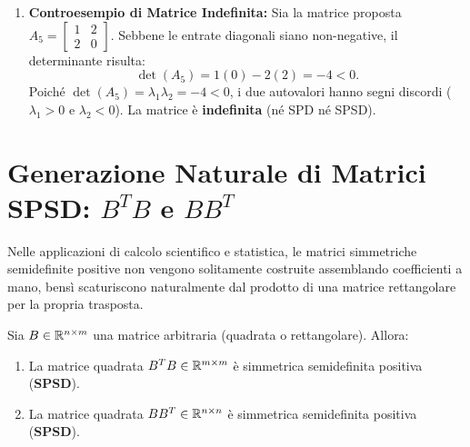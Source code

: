 \begin{example}
\begin{enumerate}
\begin{itemize}
    \end{itemize}
    \item \textbf{Controesempio di Matrice Indefinita:}
    Sia la matrice proposta $A_5 = \begin{bmatrix} 1 & 2 \\ 2 & 0 \end{bmatrix}$. Sebbene le entrate diagonali siano non-negative, il determinante risulta:
    \begin{equation}
        \det(A_5) = 1(0) - 2(2) = -4 < 0.
    \end{equation}
    Poich\'e $\det(A_5) = \lambda_1 \lambda_2 = -4 < 0$, i due autovalori hanno segni discordi ($\lambda_1 > 0$ e $\lambda_2 < 0$). La matrice \`e \textbf{indefinita} (n\'e SPD n\'e SPSD).
\end{enumerate}
\end{example}

\FloatBarrier
\section[Generazione Naturale di Matrici SPSD]{Generazione Naturale di Matrici SPSD: \texorpdfstring{$B^T B$}{B\textasciicircum T B} e \texorpdfstring{$B B^T$}{B B\textasciicircum T}}

Nelle applicazioni di calcolo scientifico e statistica, le matrici simmetriche semidefinite positive non vengono solitamente costruite assemblando coefficienti a mano, bens\`i scaturiscono naturalmente dal prodotto di una matrice rettangolare per la propria trasposta.

\begin{proposition}
\label{prop:btb-bbt-spsd}
Sia $B \in \mathbb{R}^{n \times m}$ una matrice arbitraria (quadrata o rettangolare). Allora:
\begin{enumerate}
    \item La matrice quadrata $B^T B \in \mathbb{R}^{m \times m}$ \`e simmetrica semidefinita positiva (\textbf{SPSD}).
    \item La matrice quadrata $B B^T \in \mathbb{R}^{n \times n}$ \`e simmetrica semidefinita positiva (\textbf{SPSD}).
\end{enumerate}
\end{proposition}

